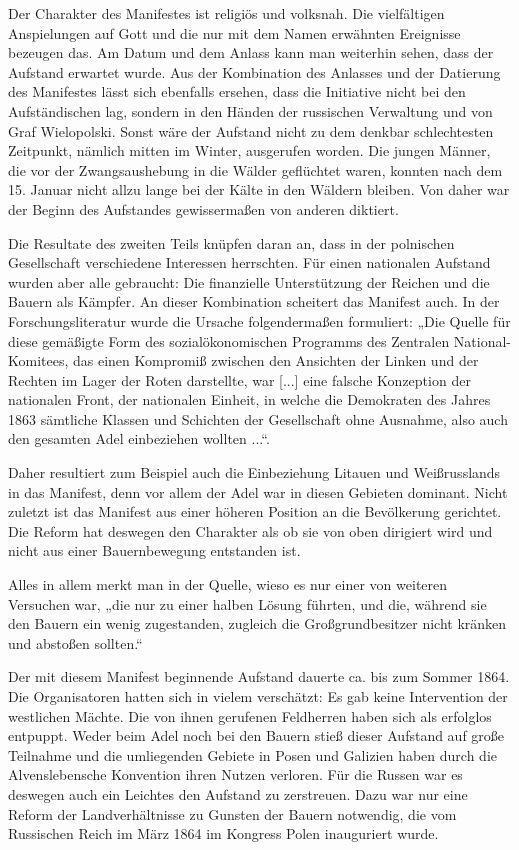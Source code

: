 \documentclass{../../sem_paper}
\begin{document}
Der Charakter des Manifestes ist religiös und volksnah. Die vielfältigen Anspielungen auf Gott und
die nur mit dem Namen erwähnten Ereignisse bezeugen das. Am Datum und dem Anlass kann man
weiterhin sehen, dass der Aufstand erwartet wurde. Aus der Kombination des Anlasses und der
Datierung des Manifestes lässt sich ebenfalls ersehen, dass die Initiative nicht bei den
Aufständischen lag, sondern in den Händen der russischen Verwaltung und von Graf Wielopolski.
Sonst wäre der Aufstand nicht zu dem denkbar schlechtesten Zeitpunkt, nämlich mitten im Winter,
ausgerufen worden. Die jungen Männer, die vor der Zwangsaushebung in die Wälder geflüchtet
waren, konnten nach dem 15. Januar nicht allzu lange bei der Kälte in den Wäldern bleiben. Von
daher war der Beginn des Aufstandes gewissermaßen von anderen diktiert.

Die Resultate des zweiten Teils knüpfen daran an, dass in der polnischen Gesellschaft verschiedene
Interessen herrschten. Für einen nationalen Aufstand wurden aber alle gebraucht: Die finanzielle
Unterstützung der Reichen und die Bauern als Kämpfer. An dieser Kombination scheitert das
Manifest auch. In der Forschungsliteratur wurde die Ursache folgendermaßen formuliert: „Die
Quelle für diese gemäßigte Form des sozialökonomischen Programms des Zentralen National-Komitees, das einen Kompromiß zwischen den Ansichten der Linken und der Rechten im Lager der
Roten darstellte, war [...] eine falsche Konzeption der nationalen Front, der nationalen Einheit, in
welche die Demokraten des Jahres 1863 sämtliche Klassen und Schichten der Gesellschaft ohne
Ausnahme, also auch den gesamten Adel einbeziehen wollten ...“.\autocite[23]{kowalski1954}

Daher resultiert zum Beispiel auch die Einbeziehung Litauen und Weißrusslands in das Manifest,
denn vor allem der Adel war in diesen Gebieten dominant. Nicht zuletzt ist das Manifest aus einer
höheren Position an die Bevölkerung gerichtet. Die Reform hat deswegen den Charakter als ob sie
von oben dirigiert wird und nicht aus einer Bauernbewegung entstanden ist.

Alles in allem merkt man in der Quelle, wieso es nur einer von weiteren Versuchen war, „die nur zu
einer halben Lösung führten, und die, während sie den Bauern ein wenig zugestanden, zugleich die
Großgrundbesitzer nicht kränken und abstoßen sollten.“\autocite[23]{kowalski1954}

Der mit diesem Manifest beginnende Aufstand dauerte ca. bis zum Sommer 1864. Die
Organisatoren hatten sich in vielem verschätzt: Es gab keine Intervention der westlichen Mächte.
Die von ihnen gerufenen Feldherren haben sich als erfolglos entpuppt. Weder beim Adel noch bei
den Bauern stieß dieser Aufstand auf große Teilnahme und die umliegenden Gebiete in Posen und
Galizien haben durch die Alvenslebensche Konvention ihren Nutzen verloren.
Für die Russen war es deswegen auch ein Leichtes den Aufstand zu zerstreuen. Dazu war nur eine
Reform der Landverhältnisse zu Gunsten der Bauern notwendig, die vom Russischen Reich im
März 1864 im Kongress Polen inauguriert wurde.

\literature
\end{document}
